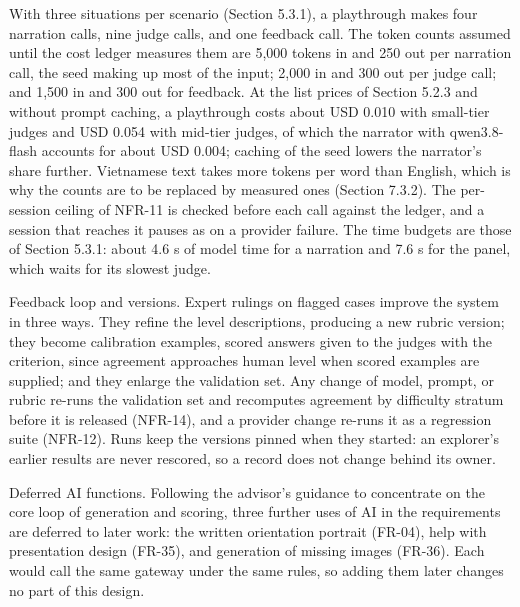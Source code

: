 With three situations per scenario (Section 5.3.1), a playthrough makes four narration calls, nine judge calls, and one feedback call. The token counts assumed until the cost ledger measures them are 5,000 tokens in and 250 out per narration call, the seed making up most of the input; 2,000 in and 300 out per judge call; and 1,500 in and 300 out for feedback. At the list prices of Section 5.2.3 and without prompt caching, a playthrough costs about USD 0.010 with small-tier judges and USD 0.054 with mid-tier judges, of which the narrator with qwen3.8-flash accounts for about USD 0.004; caching of the seed lowers the narrator's share further. Vietnamese text takes more tokens per word than English, which is why the counts are to be replaced by measured ones (Section 7.3.2). The per-session ceiling of NFR-11 is checked before each call against the ledger, and a session that reaches it pauses as on a provider failure. The time budgets are those of Section 5.3.1: about 4.6 s of model time for a narration and 7.6 s for the panel, which waits for its slowest judge.

Feedback loop and versions. Expert rulings on flagged cases improve the system in three ways. They refine the level descriptions, producing a new rubric version; they become calibration examples, scored answers given to the judges with the criterion, since agreement approaches human level when scored examples are supplied\cite{r102,r103}; and they enlarge the validation set. Any change of model, prompt, or rubric re-runs the validation set and recomputes agreement by difficulty stratum before it is released (NFR-14), and a provider change re-runs it as a regression suite (NFR-12). Runs keep the versions pinned when they started: an explorer's earlier results are never rescored, so a record does not change behind its owner.

Deferred AI functions. Following the advisor's guidance to concentrate on the core loop of generation and scoring, three further uses of AI in the requirements are deferred to later work: the written orientation portrait (FR-04), help with presentation design (FR-35), and generation of missing images (FR-36). Each would call the same gateway under the same rules, so adding them later changes no part of this design.
